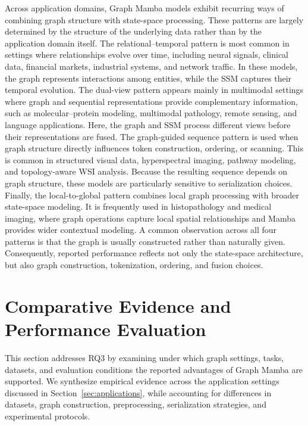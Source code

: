 \documentclass[acmsmall]{acmart}
\begin{document}
Across application domains, Graph Mamba models exhibit recurring ways of
combining graph structure with state-space processing. These patterns are
largely determined by the structure of the underlying data rather than by the
application domain itself.
The {relational--temporal} pattern is most common in settings where
relationships evolve over time, including neural signals, clinical data,
financial markets, industrial systems, and network traffic. In these models,
the graph represents interactions among entities, while the SSM captures their
temporal evolution.
The {dual-view} pattern appears mainly in multimodal settings where
graph and sequential representations provide complementary information, such
as molecular--protein modeling, multimodal pathology, remote sensing, and
language applications. Here, the graph and SSM process different views before
their representations are fused.
The {graph-guided sequence} pattern is used when graph structure
directly influences token construction, ordering, or scanning. This is common
in structured visual data, hyperspectral imaging, pathway modeling, and
topology-aware WSI analysis. Because the resulting sequence depends on graph
structure, these models are particularly sensitive to serialization choices.
Finally, the {local-to-global} pattern combines local graph
processing with broader state-space modeling. It is frequently used in
histopathology and medical imaging, where graph operations capture local
spatial relationships and Mamba provides wider contextual modeling.
A common observation across all four patterns is that the graph is usually
constructed rather than naturally given. Consequently, reported performance
reflects not only the state-space architecture, but also graph construction,
tokenization, ordering, and fusion choices.


\section{Comparative Evidence and Performance Evaluation}
\label{sec:evaluation}
This section addresses RQ3 by examining under which graph settings, tasks,
datasets, and evaluation conditions the reported advantages of Graph Mamba are
supported. We synthesize empirical evidence across the application settings
discussed in Section~\ref{sec:applications}, while accounting for differences
in datasets, graph construction, preprocessing, serialization strategies, and
experimental protocols.
\end{document}
